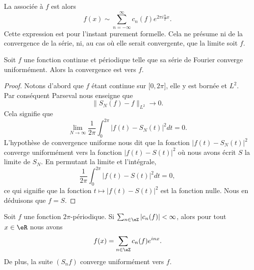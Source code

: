 La  associée à \( f\) est alors
\begin{equation}
    f(x)\sim\sum_{n=-\infty}^{\infty}c_n(f) e^{2\pi i\frac{ n }{ T }x}.
\end{equation}
Cette expression est pour l'instant purement formelle. Cela ne présume ni de la convergence de la série, ni, au cas où elle serait convergente, que la limite soit \( f\).

\begin{proposition}  \label{PropmrLfGt}
    Soit \( f\) une fonction continue et périodique telle que sa série de Fourier converge uniformément. Alors la convergence est vers \( f\).
\end{proposition}

\begin{proof}
    Notons d'abord que \( f\) étant continue sur \(\mathopen[ 0 , 2\pi \mathclose]\), elle y est bornée et \( L^2\). Par conséquent Parseval nous enseigne que 
    \begin{equation}
        \| S_N(f)-f \|_{L^2}\to 0.
    \end{equation}
    Cela signifie que
    \begin{equation}
        \lim_{N\to \infty} \frac{1}{ 2\pi }\int_{0}^{2\pi}| f(t)-S_N(t) |^2dt=0.
    \end{equation}
    L'hypothèse de convergence uniforme nous dit que la fonction \( | f(t)-S_N(t) |^2\) converge uniformément vers la fonction \( | f(t)-S(t) |^2\) où nous avons écrit \( S\) la limite de \( S_N\). En permutant la limite et l'intégrale,
    \begin{equation}
        \frac{1}{ 2\pi }\int_0^{2\pi}| f(t)-S(t) |^2dt=0,
    \end{equation}
    ce qui signifie que la fonction \( t\mapsto | f(t)-S(t) |^2\) est la fonction nulle. Nous en déduisons que \( f=S\).
\end{proof}

\begin{proposition}     \label{PropSgvPab}
    Soit \( f\) une fonction \( 2\pi\)-périodique. Si \( \sum_{n\in \eZ}| c_n(f) |<\infty\), alors pour tout \( x\in \eR\) nous avons
    \begin{equation}
        f(x)=\sum_{n\in \eZ}c_n(f) e^{inx}.
    \end{equation}
    De plus, la suite \( (S_nf)\) converge uniformément vers \( f\).
\end{proposition}

